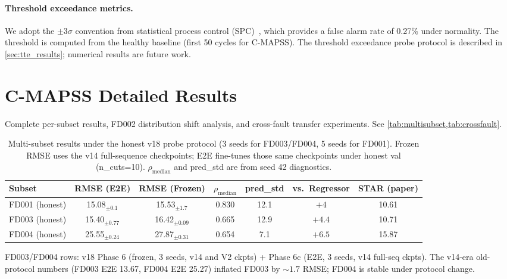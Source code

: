 \documentclass{article}
\begin{document}
\paragraph{Threshold exceedance metrics.}
We adopt the $\pm 3\sigma$ convention from statistical process control (SPC)~\citep{montgomery2020spc}, which provides a false alarm rate of 0.27\% under normality. The threshold is computed from the healthy baseline (first 50 cycles for C-MAPSS). The threshold exceedance probe protocol is described in \cref{sec:tte_results}; numerical results are future work.

\section{C-MAPSS Detailed Results}
\label{app:cmapss}

Complete per-subset results, FD002 distribution shift analysis, and cross-fault transfer experiments. See \cref{tab:multisubset,tab:crossfault}.

\begin{table}[h]
\centering
\caption{Multi-subset results under the honest v18 probe protocol (3 seeds for FD003/FD004, 5 seeds for FD001). Frozen RMSE uses the v14 full-sequence checkpoints; E2E fine-tunes those same checkpoints under honest val (n\_cuts=10). $\rho_\text{median}$ and pred\_std are from seed 42 diagnostics.}
\label{tab:multisubset}
\small
\begin{tabular}{@{}lcccccc@{}}
\toprule
Subset & RMSE (E2E) & RMSE (Frozen) & $\rho_\text{median}$ & pred\_std & vs.\ Regressor & STAR (paper) \\
\midrule
FD001 (honest) & 15.08$_{\pm0.1}$ & 15.53$_{\pm1.7}$ & 0.830 & 12.1 & $+4$ & 10.61 \\
FD003 (honest) & 15.40$_{\pm0.77}$ & 16.42$_{\pm0.09}$ & 0.665 & 12.9 & $+4.4$ & 10.71 \\
FD004 (honest) & 25.55$_{\pm0.24}$ & 27.87$_{\pm0.31}$ & 0.654 & 7.1 & $+6.5$ & 15.87 \\
\bottomrule
\end{tabular}

\vspace{2pt}
{\footnotesize\raggedright FD003/FD004 rows: v18 Phase 6 (frozen, 3 seeds, v14 and V2 ckpts) + Phase 6c (E2E, 3 seeds, v14 full-seq ckpts). The v14-era old-protocol numbers (FD003 E2E 13.67, FD004 E2E 25.27) inflated FD003 by $\sim 1.7$ RMSE; FD004 is stable under protocol change. \par}
\end{table}
\end{document}
